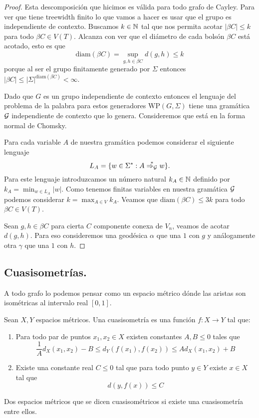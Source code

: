 \documentclass[tesis.tex]{subfiles}
\newcommand{\WP}{\text{WP}(G, \Sigma)}
\newcommand{\deriva}{\overset{*}{\Rightarrow_{\cal G}}}
\begin{document}
\begin{proof}
Esta descomposición que hicimos es válida para todo grafo de Cayley. 
Para ver que tiene treewidth finito lo que vamos a hacer es usar que el grupo es independiente de contexto. 
Buscamos $k \in \mathbb N$ tal que nos permita acotar $|\beta C| \le k$ para todo $\beta C \in V(T)$. 
Alcanza con ver que el diámetro de cada bolsón $\beta C$ está acotado, esto es que 
\[
\text{diam}(\beta C) =  \sup_{g,h \in \beta C} d(g,h) \le k
\] 
porque al ser el grupo finitamente generado por $\Sigma$ entonces $|\beta C| \le |\Sigma|^{\text{diam}(\beta C)} < \infty$. 


Dado que $G$ es un grupo independiente de contexto entonces el lenguaje del problema de la palabra para estos generadores $\WP$ tiene una gramática $\cal G$ independiente de contexto que lo genera. 
Consideremos que está en la forma normal de Chomsky.

Para cada variable $A$ de nuestra gramática podemos considerar el siguiente lenguaje
\[
L_A = \{ w \in \Sigma^* : A \deriva w  \}.
\]
Para este lenguaje introduzcamos un número natural $k_A \in \mathbb N$ definido por $k_A = \min_{w \in L_A} |w|$. 
Como tenemos finitas variables en nuestra gramática $\cal G$ podemos considerar $k = \max_{A \in V} k_A$. 
Veamos que $\text{diam}(\beta C) \le 3k$ para todo $\beta C \in V(T)$.

Sean $g,h \in \beta C$ para cierta $C$ componente conexa de $V_n$, veamos de acotar $d(g,h)$. Para eso consideremos una geodésica $\alpha$ que una $1$ con $g$ y análogamente otra $\gamma$ que una $1$ con $h$.
	
\end{proof}


\subsection{Cuasisometrías.}
A todo grafo lo podemos pensar como un espacio métrico dónde las aristas son isométricas al intervalo real $[0,1]$. 


\begin{deff}
	Sean $X,Y$ espacios métricos. Una cuasisometría es una función $f:X \to Y$ tal que:
	\begin{enumerate}
	\item Para todo par de puntos $x_1,x_2 \in X$ existen constantes $A,B \le 0$ tales que
	\[
	\frac{1}{A} d_X(x_1,x_2) - B \le d_Y(f(x_1),f(x_2)) \le A d_X(x_1,x_2) + B
	\]
	\item Existe una constante real $C \le 0$ tal que para todo punto $y \in Y$ existe $x \in X$ tal que 
	\[
	d(y,f(x)) \le C
	\]
	\end{enumerate}
 	Dos espacios métricos que se dicen cuasisométricos si existe una cuasisometría entre ellos.
\end{deff}
\end{document}
